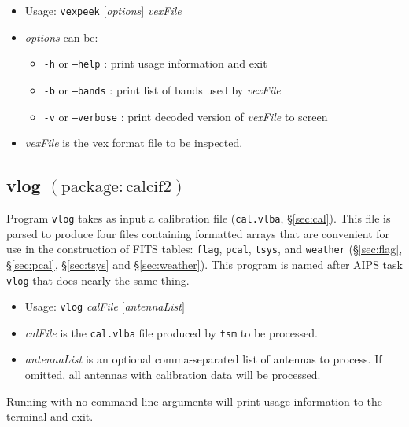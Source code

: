 \begin{itemize}
\item[] Usage: {\tt vexpeek} $[${\em options}$]$ {\em vexFile} 
\item[] {\em options} can be:
\begin{itemize}
\item[] {\tt -h} or {\tt --help} : print usage information and exit
\item[] {\tt -b} or {\tt --bands} : print list of bands used by {\em vexFile}
\item[] {\tt -v} or {\tt --verbose} : print decoded version of {\em vexFile} to screen
\end{itemize}
\item[] {\em vexFile} is the vex format file to be inspected.
\end{itemize}






\subsection{vlog {\small $\mathrm{(package: calcif2)}$}} \label{sec:vlog}

Program {\tt vlog} takes as input a calibration file ({\tt cal.vlba}, \S\ref{sec:cal}).
This file is parsed to produce four files containing formatted arrays that are convenient for use in the construction of FITS tables:
{\tt flag}, {\tt pcal}, {\tt tsys}, and {\tt weather} (\S\ref{sec:flag}, \S\ref{sec:pcal}, \S\ref{sec:tsys} and \S\ref{sec:weather}).
This program is named after AIPS task {\tt vlog} that does nearly the same thing.

\begin{itemize}
\item[] Usage: {\tt vlog} {\em calFile} $[${\em antennaList}$]$
\item[] {\em calFile} is the {\tt cal.vlba} file produced by {\tt tsm} to be processed.
\item[] {\em antennaList} is an optional comma-separated list of antennas to process.
If omitted, all antennas with calibration data will be processed.
\end{itemize}
Running with no command line arguments will print usage information to the terminal and exit.








